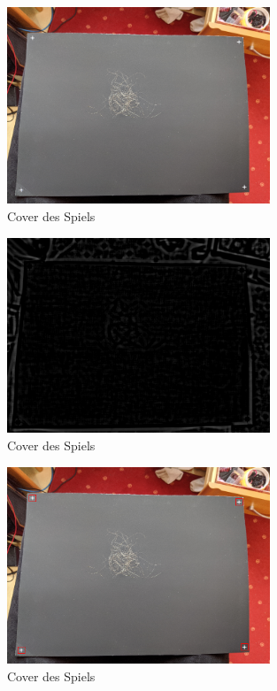 \documentclass[german,a4paper,12pt,smallheadings,headsepline, titlepage, liststotoc, idextotoc,bibtoctoc,blibliography = totocnumbered]{scrartcl}
\begin{document}
\begin{figure}
	\centering
	\includegraphics[width=0.7\textwidth]{figBina/01foundDots.png}
	\caption[]{Cover des Spiels}
	\label{img:Bina01}
\end{figure}
\begin{figure}
	\centering
	\includegraphics[width=0.7\textwidth]{figBina/01match res.png}
	\caption[]{Cover des Spiels}
	\label{img:Bina01}
\end{figure}
\begin{figure}
	\centering
	\includegraphics[width=0.7\textwidth]{figBina/02foundDots.png}
	\caption[]{Cover des Spiels}
	\label{img:Bina01}
\end{figure}
\end{document}
